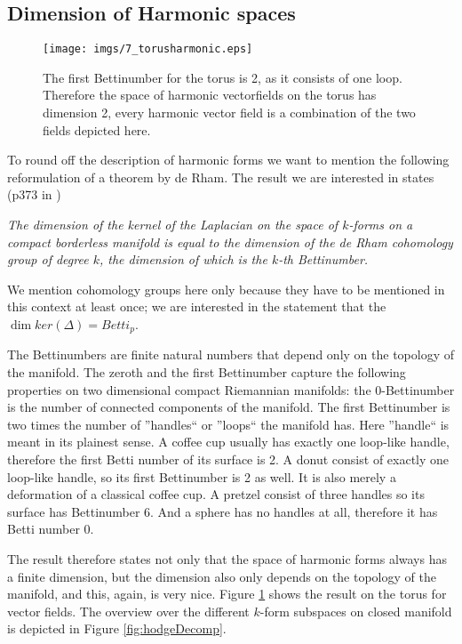 

\subsection{Dimension of Harmonic spaces }
\label{subsec:vf_dimHarm}
\begin{figure}%
\begin{center}
\texttt{[image: imgs/7\_torusharmonic.eps]}%
\end{center}
\caption{The first Bettinumber for the torus is 2, as it consists of one loop. Therefore the space of harmonic vectorfields on the torus has dimension 2, every harmonic vector field is a combination of the two fields depicted here.}%
\label{fig:vftorusharmonic}%
\end{figure}

To round off the description of harmonic forms we want to mention the following reformulation of a theorem by de Rham.
The result we are interested in states (p373 in \cite{FRANKEL11})
\vspace{0.5cm}

\emph{The dimension of the kernel of the Laplacian on the space of $k$-forms on a compact borderless manifold is equal to the dimension of the de Rham cohomology group of degree $k$, the dimension of which is the $k$-th Bettinumber.} 

\vspace{0.5cm}
We mention cohomology groups here only because they have to be mentioned in this context at least once; we are interested in the statement that the $\dim ker(\Delta) = Betti_p$.

 The Bettinumbers are finite natural numbers that depend only on the topology of the manifold. 
The zeroth and the first Bettinumber capture the following properties on two dimensional compact Riemannian manifolds: the 0-Bettinumber is the number of connected components of the manifold. The first Bettinumber is two times the number of ''handles`` or ''loops`` the manifold has. Here ''handle`` is meant in its plainest sense. A coffee cup usually has exactly one loop-like handle, therefore the first Betti number of its surface is 2. A donut consist of exactly one loop-like handle, so its first Bettinumber is 2 as well. It is also merely a deformation of a classical coffee cup. A pretzel consist of three handles so its surface has Bettinumber 6. And a sphere has no handles at all, therefore it has Betti number 0.

The result therefore states not only that the space of harmonic forms always has a finite dimension, but the dimension also only depends on the topology of the manifold, and this, again, is very nice. Figure \ref{fig:vftorusharmonic} shows the result on the torus for vector fields. The overview over the different $k$-form subspaces on closed manifold is depicted in Figure \ref{fig:hodgeDecomp}.


